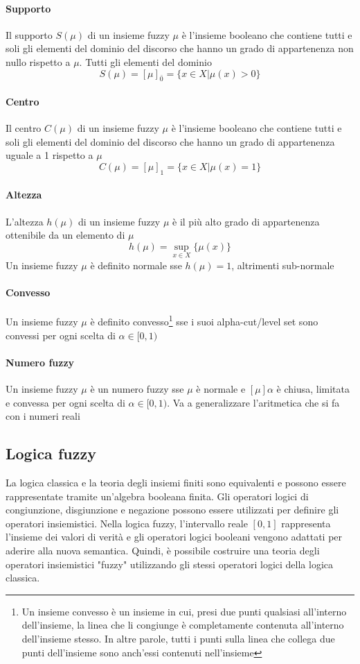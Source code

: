 \paragraph{Supporto}
Il supporto $S(\mu)$ di un insieme fuzzy $\mu$ è l'insieme booleano che contiene tutti e soli gli elementi del dominio del discorso che hanno un grado di appartenenza non nullo rispetto a $\mu$. Tutti gli elementi del dominio
$$S(\mu) = [\mu]_{\bar{0}} = \{ x \in X | \mu(x) > 0 \}$$

\paragraph{Centro}
Il centro $C(\mu)$ di un insieme fuzzy $\mu$ è l'insieme booleano che contiene tutti e soli gli elementi del dominio del discorso che hanno un grado di appartenenza uguale a 1 rispetto a $\mu$
$$C(\mu) = [\mu]_{1} = \{ x \in X | \mu(x) = 1 \}$$

\paragraph{Altezza}
L'altezza $h(\mu)$ di un insieme fuzzy $\mu$ è il più alto grado di appartenenza ottenibile da un elemento di $\mu$
$$h(\mu) = \sup_{x \in X} \{\mu(x)\}$$
Un insieme fuzzy $\mu$ è definito normale sse $h(\mu) = 1$, altrimenti sub-normale

\paragraph{Convesso}
Un insieme fuzzy $\mu$ è definito convesso\footnote{Un insieme convesso è un insieme in cui, presi due punti qualsiasi all'interno dell'insieme, la linea che li congiunge è completamente contenuta all'interno dell'insieme stesso. In altre parole, tutti i punti sulla linea che collega due punti dell'insieme sono anch'essi contenuti nell'insieme} sse i suoi alpha-cut/level set sono convessi per ogni scelta di $\alpha \in [0,1)$

\paragraph{Numero fuzzy}
Un insieme fuzzy $\mu$ è un numero fuzzy sse $\mu$ è normale e $[\mu]\alpha$
è chiusa, limitata e convessa per ogni scelta di $\alpha \in [0,1)$. Va a generalizzare l'aritmetica che si fa con i numeri reali

\subsection{Logica fuzzy}
La logica classica e la teoria degli insiemi finiti sono equivalenti e possono essere rappresentate tramite un'algebra booleana finita. Gli operatori logici di congiunzione, disgiunzione e negazione possono essere utilizzati per definire gli operatori insiemistici. Nella logica fuzzy, l'intervallo reale $[0,1]$ rappresenta l'insieme dei valori di verità e gli operatori logici booleani vengono adattati per aderire alla nuova semantica. Quindi, è possibile costruire una teoria degli operatori insiemistici "fuzzy" utilizzando gli stessi operatori logici della logica classica.

